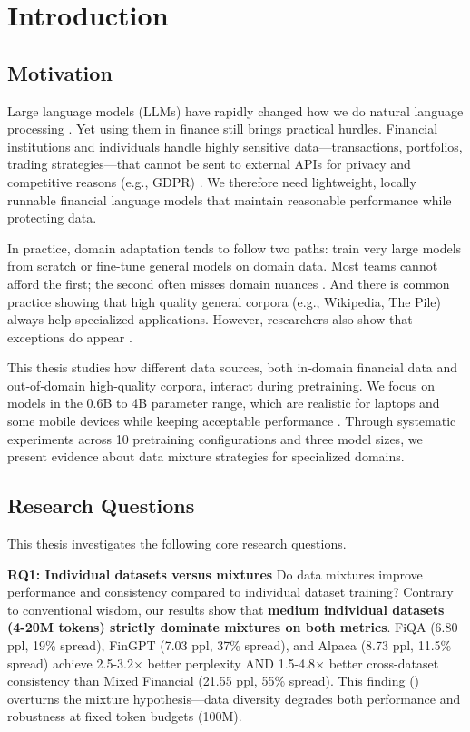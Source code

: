 \chapter{Introduction}

\section{Motivation}

Large language models (LLMs) have rapidly changed how we do natural language processing \parencite{vaswani2017attention,radford2019language,brown2020language,touvron2023llama}. Yet using them in finance still brings practical hurdles. Financial institutions and individuals handle highly sensitive data—transactions, portfolios, trading strategies—that cannot be sent to external APIs for privacy and competitive reasons (e.g., GDPR) \parencite{eu2016gdpr}. We therefore need lightweight, locally runnable financial language models that maintain reasonable performance while protecting data.

In practice, domain adaptation tends to follow two paths: train very large models from scratch or fine-tune general models on domain data. Most teams cannot afford the first; the second often misses domain nuances \parencite{gururangan2020don}. And there is common practice showing that high quality general corpora (e.g., Wikipedia, The Pile) always help specialized applications. However, researchers also show that exceptions do appear \parencite{gao2020pile,raffel2020exploring,longpre2023pretrainer}.

This thesis studies how different data sources, both in‑domain financial data and out‑of‑domain high‑quality corpora, interact during pretraining. We focus on models in the 0.6B to 4B parameter range, which are realistic for laptops and some mobile devices while keeping acceptable performance \parencite{yang2024qwen2,xia2023sheared,team2024gemma,javaheripi2023phi}. Through systematic experiments across 10 pretraining configurations and three model sizes, we present evidence about data mixture strategies for specialized domains.

\section{Research Questions}

This thesis investigates the following core research questions.

\textbf{RQ1: Individual datasets versus mixtures}
Do data mixtures improve performance and consistency compared to individual dataset training? Contrary to conventional wisdom, our results show that \textbf{medium individual datasets (4-20M tokens) strictly dominate mixtures on both metrics}. FiQA (6.80 ppl, 19\% spread), FinGPT (7.03 ppl, 37\% spread), and Alpaca (8.73 ppl, 11.5\% spread) achieve 2.5-3.2$\times$ better perplexity AND 1.5-4.8$\times$ better cross-dataset consistency than Mixed Financial (21.55 ppl, 55\% spread). This finding () overturns the mixture hypothesis—data diversity degrades both performance and robustness at fixed token budgets (100M).

